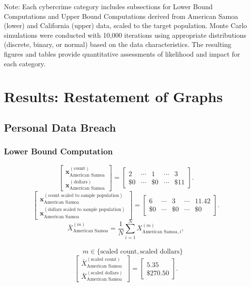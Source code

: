 \begin{table}[H]
\begin{tabular}{@{}p{0.18\linewidth}p{0.18\linewidth}p{0.18\linewidth}p{0.14\linewidth}p{0.22\linewidth}@{}}
    \bottomrule
  \end{tabular}
  \raggedright{\small Note: Each cybercrime category includes subsections for Lower Bound Computations and Upper Bound Computations derived from American Samoa (lower) and California (upper) data, scaled to the target population. Monte Carlo simulations were conducted with 10,000 iterations using appropriate distributions (discrete, binary, or normal) based on the data characteristics. The resulting figures and tables provide quantitative assessments of likelihood and impact for each category.}
\end{table}
\section{Results:  Restatement of Graphs}
\newpage
\subsection{Personal Data Breach}\label{sec:persdatabreach}
\subsubsection{Lower Bound Computation}
\[
\begin{bmatrix}
\mathbf{x}_{\text{American Samoa}}^{(\text{count})}\\
\mathbf{x}_{\text{American Samoa}}^{(\text{dollars})}
\end{bmatrix}
=
\begin{bmatrix}
2 & \cdots & 1 & \cdots & 3\\
\$0 & \cdots & \$0 & \cdots & \$11
\end{bmatrix}.
\]
\[
\begin{bmatrix}
\mathbf{x}_{\text{American Samoa}}^{(\text{count scaled to sample population})}\\
\mathbf{x}_{\text{American Samoa}}^{(\text{dollars scaled to sample population})}
\end{bmatrix}
=
\begin{bmatrix}
6 & \cdots & 3 & \cdots & 11.42\\
\$0 & \cdots & \$0 & \cdots & \$0
\end{bmatrix}.
\]
  \[
\bar{X}_{\text{American Samoa}}^{(m)}
= \frac{1}{N}\sum_{i=1}^{N} X_{\text{American Samoa},i}^{(m)},
\]
\\
\[
\qquad
m \in \{\text{scaled count},\text{scaled dollars}\}
\]
\[
\begin{bmatrix}
\bar{X}_{\text{American Samoa}}^{(\text{scaled count})}\\
\bar{X}_{\text{American Samoa}}^{(\text{scaled dollars})}
\end{bmatrix}
=
\begin{bmatrix}
5.35\\
\$270.50
\end{bmatrix}.
\]
